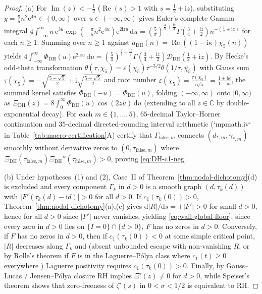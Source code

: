 \documentclass[11pt,reqno]{amsart}
\theoremstyle{definition}
\theoremstyle{remark}
\numberwithin{equation}{section}
\newcommand{\dd}{\mathrm{d}}
\newcommand{\ii}{\mathrm{i}}
\newcommand{\ee}{\mathrm{e}}
\newcommand{\RePt}{\operatorname{Re}}
\newcommand{\ImPt}{\operatorname{Im}}
\newcommand{\DHf}{\mathrm{DH}}
\begin{document}
\begin{proof}
(a) For $\ImPt(z) < -\frac{1}{2}$ ($\RePt(s) > 1$ with $s = \frac{1}{2} + \ii z$), substituting $y = \frac{\pi}{5}n^2\ee^{4u} \in (0,\infty)$ over $u \in (-\infty,\infty)$ gives Euler's complete Gamma integral $4\int_{-\infty}^\infty n\,\ee^{3u}\exp(-\frac{\pi}{5}n^2\ee^{4u})\ee^{2\ii zu}\,\dd u = (\frac{5}{\pi})^{\frac{3}{4}+\frac{\ii z}{2}}\Gamma(\frac{3}{4}+\frac{\ii z}{2})n^{-(\frac{1}{2}+\ii z)}$ for each $n \ge 1$. Summing over $n \ge 1$ against $a_{\DHf}(n) = \RePt((1-\ii\kappa)\chi_5(n))$ yields $4\int_{-\infty}^\infty \Phi_{\DHf}(u)\ee^{2\ii zu}\,\dd u = (\frac{5}{\pi})^{\frac{3}{4}+\frac{\ii z}{2}}\Gamma(\frac{3}{4}+\frac{\ii z}{2})\mathcal{D}_{\DHf}(\frac{1}{2}+\ii z)$. By Hecke's odd-theta transformation $\theta(\tau,\chi_5) = \varepsilon(\chi_5)\tau^{-3/2}\theta(1/\tau,\overline{\chi_5})$ \cite{Hecke1937,Titchmarsh1986} with Gauss sum $\tau(\chi_5) = -\sqrt{\frac{5-\sqrt{5}}{2}} + \ii\sqrt{\frac{5+\sqrt{5}}{2}}$ and root number $\varepsilon(\chi_5) = \frac{\tau(\chi_5)}{\ii\sqrt{5}} = \frac{1+\ii\kappa}{1-\ii\kappa}$, the summed kernel satisfies $\Phi_{\DHf}(-u) = \Phi_{\DHf}(u)$, folding $(-\infty,\infty)$ onto $[0,\infty)$ as $\Xi_{\DHf}(z) = 8\int_0^\infty \Phi_{\DHf}(u)\cos(2zu)\,\dd u$ (extending to all $z \in \mathbb{C}$ by double-exponential decay). For each $m \in \{1,\dots,5\}$, $65$-decimal Taylor--Horner continuation and $35$-decimal directed-rounding interval arithmetic (`mpmath.iv` in Table~\ref{tab:macro-certification}A) certify that $\Gamma_{\mathrm{false},m}$ connects $(d_{*,m},\gamma_{*,m})$ smoothly without derivative zeros to $(0,\tau_{\mathrm{false},m})$ where $\Xi_{\DHf}(\tau_{\mathrm{false},m})\Xi_{\DHf}''(\tau_{\mathrm{false},m}) > 0$, proving \eqref{eq:DH-c1-neg}.

(b) Under hypotheses~(1) and (2), Case~II of Theorem~\ref{thm:nodal-dichotomy}(d) is excluded and every component $\Gamma_k$ in $d>0$ is a smooth graph $(d,\tau_k(d))$ with $|F'(\tau_k(d)-\ii d)| > 0$ for all $d>0$. If $c_1(\tau_k(0)) > 0$, Theorem~\ref{thm:nodal-dichotomy}(a),(c) gives $\dd|R|/\dd s = +|F'| > 0$ for small $d>0$, hence for all $d>0$ since $|F'|$ never vanishes, yielding \eqref{eq:wall-global-floor}; since every zero in $d>0$ lies on $\{I=0\}\cap\{d>0\}$, $F$ has no zeros in $d>0$. Conversely, if $F$ has no zeros in $d>0$, then if $c_1(\tau_k(0)) < 0$ at some simple critical point, $|R|$ decreases along $\Gamma_k$ and (absent unbounded escape with non-vanishing $R$, or by Rolle's theorem if $F$ is in the Laguerre--P\'{o}lya class where $c_1(t)\ge 0$ everywhere \cite{Laguerre1898,CravenCsordasSmith1987}) Laguerre positivity requires $c_1(\tau_k(0)) > 0$. Finally, by Gauss--Lucas / Jensen--P\'{o}lya closure \cite{Jensen1913,Polya1926} RH implies $\Xi'(z)\ne 0$ for $d>0$, while Speiser's theorem \cite{Speiser1934} shows that zero-freeness of $\zeta'(s)$ in $0<\sigma<1/2$ is equivalent to RH.
\end{proof}
\end{document}
